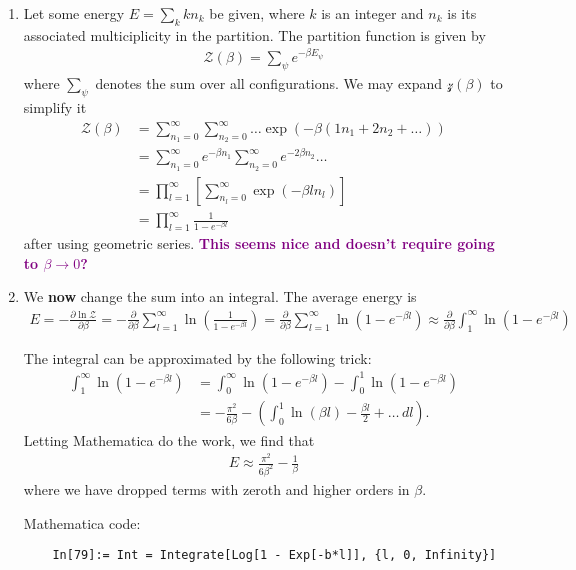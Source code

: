 \documentclass{article}
\theoremstyle{definition}
\newcommand{\p}{\partial}
\newcommand{\be}{\beta}
\newcommand{\f}[2]{\frac{#1}{#2}}
\newcommand{\lp}{\left(}
\newcommand{\rp}{\right)}
\newcommand{\lb}{\left[}
\newcommand{\rb}{\right]}
\begin{document}
\begin{enumerate}[label=(\alph*)]
	\item Let some energy $E = \sum_k k n_k$ be given, where $k$ is an integer and $n_k$ is its associated multiciplicity in the partition. The partition function is given by 
	\begin{align*}
	\mathcal{Z}(\be) = \sum_{\psi } e^{-\be E_\psi}
	\end{align*}
	where $\sum_\psi$ denotes the sum over all configurations. We may expand $\mathcal{z}(\be)$ to simplify it
	\begin{align*}
	\mathcal{Z}(\be)
	&= \sum_{n_1=0}^\infty \sum_{n_2=0}^\infty \dots \exp\lp -\be (1 n_1 + 2  n_2 + \dots )\rp \\
	&= \sum_{n_1=0}^\infty e^{-\be n_1} \sum_{n_2= 0}^\infty e^{-2\be n_2 } \dots \\
	&= \prod_{l=1}^\infty \lb \sum_{n_l=0}^\infty \exp\lp -\be l n_l \rp \rb \\
	&= \prod_{l=1}^\infty \f{1}{1 - e^{-\be l}}
	\end{align*} 
	after using geometric series. \textbf{\textcolor{purple}{This seems nice and doesn't require going to $\be\to 0$? }}
	
	
	
	\item We \textbf{now} change the sum into an integral. The average energy is 
	\begin{align*}
	E = -\f{\p \ln \mathcal{Z}}{\p \be} = -\f{\p}{\p \be}\sum_{l=1}^\infty \ln \lp \f{1}{1 - e^{-\be l}}  \rp = \f{\p}{\p \be}\sum_{l=1}^\infty \ln \lp 1 - e^{-\be l} \rp \approx \f{\p}{\p \be}\int_1^\infty \ln \lp 1 - e^{-\be l} \rp 
	\end{align*}	

	The integral can be approximated by the following trick:
	\begin{align*}
	\int_1^\infty \ln \lp 1 - e^{-\be l} \rp 
	&= \int_0^\infty \ln \lp 1 - e^{-\be l} \rp - \int_0^1 \ln \lp 1 - e^{-\be l} \rp \\
	&= -\f{\pi^2}{6\be} - \lp \int_0^1 \ln(\be l) - \f{\be l}{2} + \dots \,dl \rp.
	\end{align*}
	Letting Mathematica do the work, we find that
	\begin{align*}
	\boxed{E \approx \f{\pi^2}{6\be^2} - \f{1}{\be}}
	\end{align*}
	where we have dropped terms with zeroth and higher orders in $\be$. 
	
	Mathematica code:
	\begin{lstlisting}
	In[79]:= Int = Integrate[Log[1 - Exp[-b*l]], {l, 0, Infinity}]
	

\end{lstlisting}
\end{enumerate}
\end{document}
